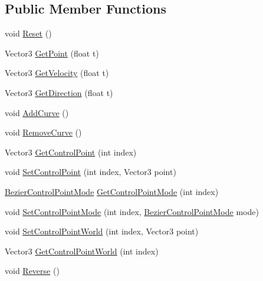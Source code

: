 \subsection*{Public Member Functions}
\begin{DoxyCompactItemize}
\item 
void \mbox{\hyperlink{class_bezier_spline_a69c0d6f430f28fec72bffb8812861247}{Reset}} ()
\item 
Vector3 \mbox{\hyperlink{class_bezier_spline_a4a9993e2dafa4a6b8819d94a25c70245}{Get\+Point}} (float t)
\item 
Vector3 \mbox{\hyperlink{class_bezier_spline_a0d8c73af995773501fd3e5c4dac4c3b6}{Get\+Velocity}} (float t)
\item 
Vector3 \mbox{\hyperlink{class_bezier_spline_a24c9b2087b16b650871a9ed2355987cc}{Get\+Direction}} (float t)
\item 
void \mbox{\hyperlink{class_bezier_spline_a4676e1c6d2cfc8454c028e30d54783bd}{Add\+Curve}} ()
\item 
void \mbox{\hyperlink{class_bezier_spline_ad13eae2643c35fc4e3f2e6e614e616bb}{Remove\+Curve}} ()
\item 
Vector3 \mbox{\hyperlink{class_bezier_spline_aee83e5e470e3d7d23f75875c81bbd326}{Get\+Control\+Point}} (int index)
\item 
void \mbox{\hyperlink{class_bezier_spline_aed423df0d5f7c31a82a617ad8ebc23e4}{Set\+Control\+Point}} (int index, Vector3 point)
\item 
\mbox{\hyperlink{_bezier_spline_follower_8cs_a41ff1a7271616f36cab397d937ee41b0}{Bezier\+Control\+Point\+Mode}} \mbox{\hyperlink{class_bezier_spline_a1600b5bf35f1aa796e5fbe227b5a767d}{Get\+Control\+Point\+Mode}} (int index)
\item 
void \mbox{\hyperlink{class_bezier_spline_a5c538c5216c5743de35ce9999760749c}{Set\+Control\+Point\+Mode}} (int index, \mbox{\hyperlink{_bezier_spline_follower_8cs_a41ff1a7271616f36cab397d937ee41b0}{Bezier\+Control\+Point\+Mode}} mode)
\item 
void \mbox{\hyperlink{class_bezier_spline_a8090492aaedbf221cbc0cb6568674e10}{Set\+Control\+Point\+World}} (int index, Vector3 point)
\item 
Vector3 \mbox{\hyperlink{class_bezier_spline_adb2e4e13eeea255f7f91d9815724f2d3}{Get\+Control\+Point\+World}} (int index)
\item 
void \mbox{\hyperlink{class_bezier_spline_a06c69b2f3fed52bbd31ad05b93d5d336}{Reverse}} ()
\end{DoxyCompactItemize}
